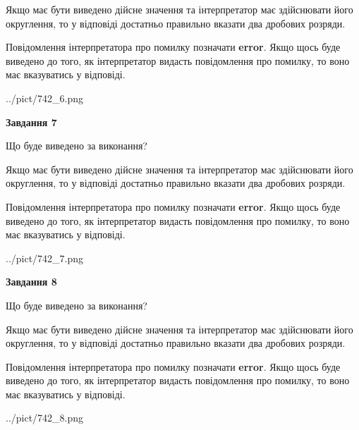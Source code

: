 \documentclass[12pt, ukrainian]{article}
\begin{document}
{\begin {Large}
Якщо має бути виведено дійсне значення та інтерпретатор має здійснювати його округлення, 
то у відповіді достатньо правильно вказати два дробових розряди.

Повідомлення інтерпретатора про помилку позначати \textbf{error}.
Якщо щось буде виведено до того, як інтерпретатор видасть повідомлення про помилку, 
то воно має вказуватись у відповіді. \par

\begin{center}
	{../pict/742_6.png}
\end{center}
\newpage

{\begin {center}\textbf{Завдання 7}\end {center}}\par
Що буде виведено за виконання? \par

Якщо має бути виведено дійсне значення та інтерпретатор має здійснювати його округлення, 
то у відповіді достатньо правильно вказати два дробових розряди.

Повідомлення інтерпретатора про помилку позначати \textbf{error}.
Якщо щось буде виведено до того, як інтерпретатор видасть повідомлення про помилку, 
то воно має вказуватись у відповіді. \par

\begin{center}
	{../pict/742_7.png}
\end{center}
\newpage

{\begin {center}\textbf{Завдання 8}\end {center}}\par
Що буде виведено за виконання? \par

Якщо має бути виведено дійсне значення та інтерпретатор має здійснювати його округлення, 
то у відповіді достатньо правильно вказати два дробових розряди.

Повідомлення інтерпретатора про помилку позначати \textbf{error}.
Якщо щось буде виведено до того, як інтерпретатор видасть повідомлення про помилку, 
то воно має вказуватись у відповіді. \par

\begin{center}
	{../pict/742_8.png}
\end{center}
\newpage


\end{Large}}
\end{document}
